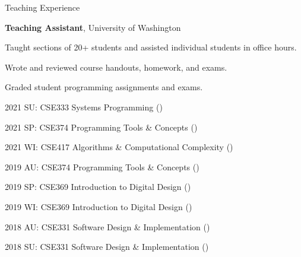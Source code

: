 \begin{rubric}{Teaching Experience}

\entry*[2018 -- 2021] %
	\textbf{Teaching Assistant}, University of Washington
	\par Taught sections of 20+ students and assisted individual students in office hours.
	\par Wrote and reviewed course handouts, homework, and exams.
	\par Graded student programming assignments and exams.
	\par 2021 SU: CSE333 Systems Programming (\pWangC{})
	\par 2021 SP: CSE374 Programming Tools \& Concepts (\pHazenM{})
	\par 2021 WI: CSE417 Algorithms \& Computational Complexity (\pWeberR{})
	\par 2019 AU: CSE374 Programming Tools \& Concepts (\pPirtleT{})
	\par 2019 SP: CSE369 Introduction to Digital Design (\pHsiaJ{})
	\par 2019 WI: CSE369 Introduction to Digital Design (\pHsiaJ{})
	\par 2018 AU: CSE331 Software Design \& Implementation (\pErnstM{})
	\par 2018 SU: CSE331 Software Design \& Implementation (\pPerlmutterL{})
\end{rubric}
